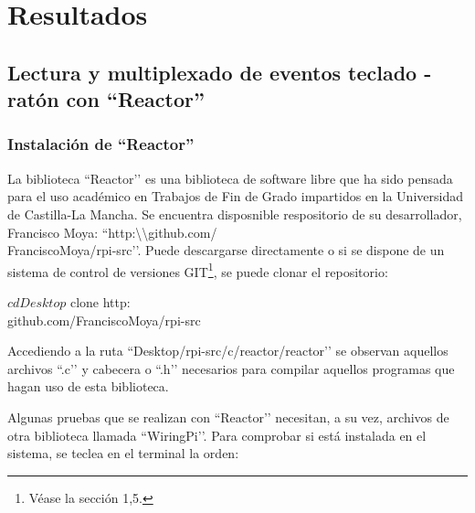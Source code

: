 \chapter{Resultados} \label{cap4}



\newpage

\section{Lectura y multiplexado de eventos teclado - ratón con ``Reactor''} \label{s4_1}

\subsection{Instalación de ``Reactor''} \label{s4_1_1}

La biblioteca ``Reactor’’ es una biblioteca de software libre que ha sido pensada para el uso académico en Trabajos de Fin de Grado impartidos en la Universidad de Castilla-La Mancha. Se encuentra disposnible respositorio de su desarrollador, Francisco Moya: ``http:\textbackslash \textbackslash github.com/\\FranciscoMoya/rpi-src’’. Puede descargarse directamente o si se dispone de un sistema de control de versiones GIT\footnote{Véase la sección 1,5.}, se puede clonar el repositorio: \\

\begin{bashcode}
$ cd Desktop
$ clone http:\\github.com/FranciscoMoya/rpi-src
\end{bashcode}

Accediendo a la ruta ``Desktop/rpi-src/c/reactor/reactor’’ se observan aquellos archivos ``.c’’ y cabecera o ``.h’’ necesarios para compilar aquellos programas que hagan uso de esta biblioteca.

Algunas pruebas que se realizan con ``Reactor’’ necesitan, a su vez, archivos de otra biblioteca llamada ``WiringPi’’. Para comprobar si está instalada en el sistema, se teclea en el terminal la orden:\\

